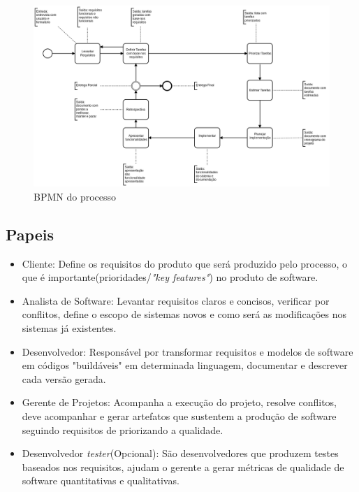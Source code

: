 \documentclass[	DIV=calc,%
							paper=a4,%
							fontsize=12pt,%
							onecolumn]{scrartcl}	 					%
\begin{document}
\begin{figure}
	\centering
	\includegraphics[width=\textwidth]{bpmn.png}
	\caption{BPMN do processo}
	\label{bpmn}
\end{figure}


\subsection{Papeis}
\begin{itemize}
	\item Cliente: Define os requisitos do produto que será produzido pelo processo, o que é importante(prioridades/\textit{"key features"}) no produto de software.
	\item Analista de Software: Levantar requisitos claros e concisos, verificar por conflitos, define o  escopo de sistemas novos e como será as modificações nos sistemas já existentes.
	\item Desenvolvedor: Responsável por transformar requisitos e modelos de software em códigos "buildáveis" em determinada linguagem, documentar e descrever cada versão gerada.
	\item Gerente de Projetos: Acompanha a execução do projeto, resolve conflitos, deve acompanhar e gerar artefatos que sustentem a produção de software seguindo requisitos de priorizando a qualidade.
	\item Desenvolvedor \textit{tester}(Opcional): São desenvolvedores que produzem testes baseados nos requisitos, ajudam o gerente a gerar métricas de qualidade de software quantitativas e qualitativas.   
\end{itemize}
\end{document}
